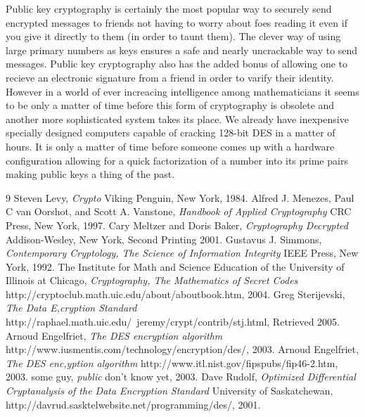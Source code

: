 \documentclass[12pt]{report}
\begin{document}
Public key cryptography is certainly the most popular way to securely send encrypted messages to friends not having to worry about foes reading it even if you give it directly to them (in order to taunt them).  The clever way of using large primary numbers as keys ensures a safe and nearly uncrackable way to send messages.  Public key cryptography also has the added bonus of allowing one to recieve an electronic signature from a friend in order to varify their identity.  However in a world of ever increacing intelligence among mathematicians it seems to be only a matter of time before this form of cryptography is obsolete and another more sophisticated system takes its place.  We already have inexpensive specially designed computers capable of cracking 128-bit DES in a matter of hours.  It is only a matter of time before someone comes up with a hardware configuration allowing for a quick factorization of a number into its prime pairs making public keys a thing of the past.

\begin{thebibliography} {9}
	  Steven Levy,
	  \emph{Crypto}
	  Viking Penguin, New York,
	  1984.
	  Alfred J. Menezes, Paul C van Oorshot, and Scott A. Vanstone,
	  \emph{Handbook of Applied Cryptography}
	  CRC Press, New York,
	  1997.
	  Cary Meltzer and Doris Baker,
	  \emph{Cryptography Decrypted}
	  Addison-Wesley, New York,
	  Second Printing
	  2001.
	  Gustavus J. Simmons,
	  \emph{Contemporary Cryptology, The Science of Information Integrity}
	  IEEE Press, New York,
	  1992.
	  The Institute for Math and Science Education of the University of Illinois at Chicago,
	  \emph{Cryptography, The Mathematics of Secret Codes}
	  http://cryptoclub.math.uic.edu/about/aboutbook.htm,
	  2004.
	  Greg Sterijevski,
	  \emph{The Data E,cryption Standard}
	  http://raphael.math.uic.edu/~jeremy/crypt/contrib/stj.html,
	  Retrieved 2005.
	  Arnoud Engelfriet,
	  \emph{The DES encryption algorithm}
	  http://www.iusmentis.com/technology/encryption/des/,
	  2003.
	  Arnoud Engelfriet,
	  \emph{The DES enc,yption algorithm}
	  http://www.itl.nist.gov/fipspubs/fip46-2.htm,
	  2003.
	  some guy,
	  \emph{public}
	  don't know yet,
	  2003.
	  Dave Rudolf,
	  \emph{Optimized Differential Cryptanalysis of the Data Encryption Standard}
	  University of Saskatchewan, http://davrud.sasktelwebsite.net/programming/des/,
	  2001.
\end{thebibliography}
\end{document}
